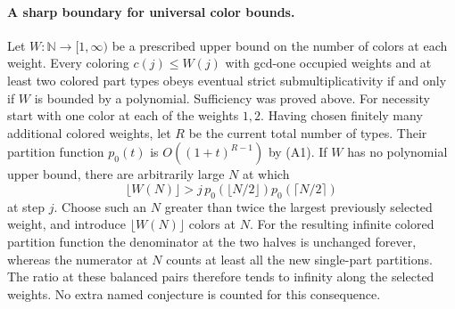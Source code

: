 \documentclass[11pt,a4paper]{article}
\numberwithin{equation}{section}
\begin{document}
\paragraph{A sharp boundary for universal color bounds.}
Let $W:\mathbb{N}\to[1,\infty)$ be a prescribed upper bound on the
number of colors at each weight. Every coloring $c(j)\le W(j)$
with gcd-one occupied weights and at least two colored part types
obeys eventual strict submultiplicativity if and only if $W$ is
bounded by a polynomial. Sufficiency was proved above. For necessity
start with one color at each of the weights $1,2$. Having chosen
finitely many additional colored weights, let $R$ be the current
total number of types. Their partition function $p_0(t)$ is
$O((1+t)^{R-1})$ by (A1). If $W$ has no polynomial upper bound,
there are arbitrarily large $N$ at which
\[
 \lfloor W(N)\rfloor>
 j\,p_0(\lfloor N/2\rfloor)p_0(\lceil N/2\rceil)
\]
at step $j$. Choose such an $N$ greater than twice the largest
previously selected weight, and introduce $\lfloor W(N)\rfloor$
colors at $N$. For the resulting infinite colored partition function
the denominator at the two halves is unchanged forever, whereas
the numerator at $N$ counts at least all the new single-part
partitions. The ratio at these balanced pairs therefore tends to
infinity along the selected weights. No extra named conjecture is
counted for this consequence.
\end{document}
